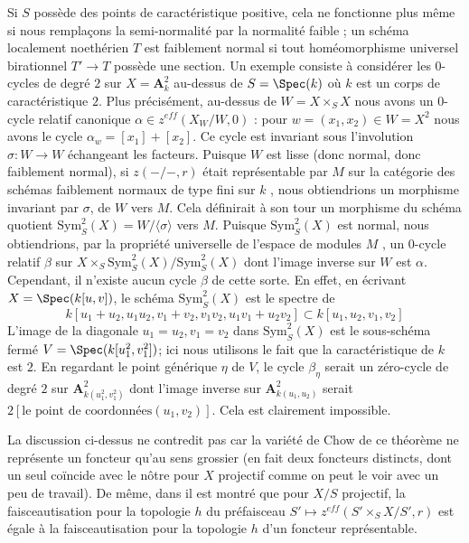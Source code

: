 \begin{remark}
\medskip\noindent
 Si  $S$  possède des points de caractéristique positive, cela ne fonctionne plus même
 si nous remplaçons la semi-normalité par la normalité faible ; un schéma localement 
noethérien  $T$  est faiblement normal si tout homéomorphisme universel birationnel  
$T' \to T$  possède une section. Un exemple consiste à considérer les  $0$-cycles de degré  
$2$  sur  $X = \mathbf{A}^2_k$ au-dessus de  $S = \Spec(k)$  où  $k$  est un corps 
de caractéristique $2$. Plus précisément, au-dessus de  $W = X \times_S X$  nous avons
 un  $0$-cycle relatif canonique  $\alpha \in z^{eff}(X_W/W, 0)$ : pour  
$w = (x_1, x_2) \in W = X^2$  nous avons le cycle $\alpha_w = [x_1] + [x_2]$.
 Ce cycle est invariant sous l'involution  $\sigma : W \to W$  échangeant
 les facteurs. Puisque  $W$  est lisse (donc normal, donc faiblement normal), si 
$z(-/-, r)$  était représentable par  $M$  sur la catégorie des schémas faiblement
 normaux de type fini sur  $k$ , nous obtiendrions un morphisme invariant par  $\sigma$, 
de  $W$  vers  $M$. Cela définirait à son tour un morphisme du 
schéma quotient  $\text{Sym}^2_S(X) = W/\langle \sigma \rangle$  vers  $M$.
 Puisque $\text{Sym}^2_S(X)$  est normal, nous obtiendrions, par la propriété universelle de l'espace de modules $M$
 , un  $0$-cycle relatif  $\beta$  sur  
$X \times_S \text{Sym}^2_S(X) / \text{Sym}^2_S(X)$
  dont l'image inverse sur  $W$  est  $\alpha$. Cependant, il n'existe aucun cycle $\beta$  
de cette sorte. En effet, en écrivant  $X = \Spec(k[u, v])$, le schéma  
$\text{Sym}^2_S(X)$ est le spectre de 
$$
k[u_1 + u_2, u_1u_2, v_1 + v_2, v_1v_2, u_1v_1 + u_2v_2]
\subset
k[u_1, u_2, v_1, v_2]
$$
 L'image de la diagonale  $u_1 = u_2, v_1 = v_2$  dans  $\text{Sym}^2_S(X)$
  est le sous-schéma fermé $V = \Spec(k[u_1^2, v_1^2])$; ici nous utilisons le 
fait que la caractéristique de  $k$ est  $2$. En regardant le 
point générique  $\eta$  de  $V$, le cycle  $\beta_\eta$  serait un 
zéro-cycle de degré  $2$  sur  $\mathbf{A}^2_{k(u_1^2, v_1^2)}$
 dont l'image inverse sur  $\mathbf{A}^2_{k(u_1, u_2)}$  serait  
$2[\text{le point de coordonnées} (u_1, v_2)]$.
 Cela est clairement impossible. 

\medskip\noindent
 La discussion ci-dessus ne contredit pas  \cite[Theorem 4.13]{KRC}  car la variété
 de Chow de ce théorème ne représente un foncteur qu'au sens grossier (en
 fait deux foncteurs distincts, dont un seul coïncide avec le nôtre pour  $X$
  projectif comme on peut le voir avec un peu de travail). De même, dans  \cite[Section 4.4]{SV}
  il est montré que pour  $X/S$  projectif, la faisceautisation pour la topologie  $h$ du préfaisceau 
$S' \mapsto z^{eff}(S' \times_S X/S', r)$  est égale à la faisceautisation pour la topologie  $h$ d'un foncteur
 représentable. 
\end{remark} 

